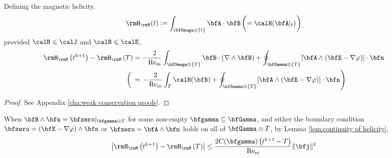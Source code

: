     \begin{theorem}
        Defining the magnetic helicity,
        \begin{equation}
            \rmH_{\rmM}(t)  :=  \int_{\bfOmega\otimes\{t\}}\bfA\cdot\bfB  \left(=  \calH(\bfA|_{t})\tall\right)
        \end{equation}
        provided $\calB  \leqslant  \calJ$ and $\calB  \leqslant  \calE$,
        \begin{align}
            \rmH_{\rmM}\left(t^{k + 1}\right) - \rmH_{\rmM}\left(T\right)  &=  - \frac{2}{\rmRem}\int_{\bfOmega\otimes\left\{T\right\}}\bfB\cdot(\nabla\wedge\bfB) + \oint_{\bfGamma\otimes\left\{T\right\}}[\bfA\wedge(\bfE - \nabla\varphi)]\cdot\bfn  \\
            \left(\tall\right.&=  \left.- \frac{2}{\rmRem}\int_{T}\calH(\bfB) + \oint_{\bfGamma\otimes\left\{T\right\}}[\bfA\wedge(\bfE - \nabla\varphi)]\cdot\bfn\tall\right)
        \end{align}
    \end{theorem}
    \begin{proof}
        See Appendix \ref{cha:weak conservation proofs}.
    \end{proof}

    \begin{corollary}
        When $\bfB\wedge\bfn  =  \bfzero|_{\bfgamma\otimes T}$ for some non-empty $\bfgamma  \subseteq  \bfGamma$, and either the boundary condition $\bfzero  =  (\bfE - \nabla\varphi)\wedge\bfn$ or $\bfzero  =  \bfA\wedge\bfn$ holds on all of $\bfGamma\otimes T$, by Lemma \ref{lem:continuity of helicity},
        \begin{equation}
            \left|\rmH_{\rmM}\left(t^{k + 1}\right) - \rmH_{\rmM}\left(T\right)\right|  \leq  \frac{2C(\bfgamma)\left(t^{k + 1} - T\right)}{\rmRem}\|\bfj\|^{2}
        \end{equation}
    \end{corollary}

    \line
    
